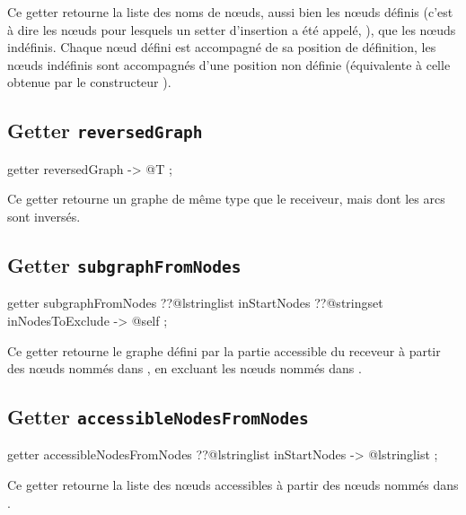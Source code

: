 Ce getter retourne la liste des noms de nœuds, aussi bien les nœuds définis (c'est à dire les nœuds pour lesquels un setter d'insertion a été appelé, ), que les nœuds indéfinis. Chaque nœud défini est accompagné de sa position de définition, les nœuds indéfinis sont accompagnés d'une position non définie (équivalente à celle obtenue par le constructeur ).



\subsection{Getter \texttt{reversedGraph}}

\begin{galgascode}
getter reversedGraph -> @T ;
\end{galgascode}

Ce getter retourne un graphe de même type que le receiveur, mais dont les arcs sont inversés.





\subsection{Getter \texttt{subgraphFromNodes}}

\begin{galgascode}
getter subgraphFromNodes
  ??@lstringlist inStartNodes
  ??@stringset inNodesToExclude
  -> @self ;
\end{galgascode}

Ce getter retourne le graphe défini par la partie accessible du receveur à partir des nœuds nommés dans , en excluant les nœuds nommés dans .






\subsection{Getter \texttt{accessibleNodesFromNodes}}

\begin{galgascode}
getter accessibleNodesFromNodes
  ??@lstringlist inStartNodes
  -> @lstringlist ;
\end{galgascode}

Ce getter retourne la liste des nœuds accessibles à partir des nœuds nommés dans .






